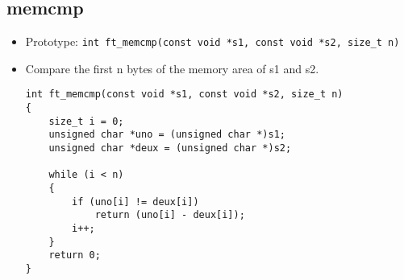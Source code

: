\documentclass{article}
\begin{document}
		\subsection{memcmp}
			\begin{itemize}[label=$\rightarrow$]
				\item Prototype: \texttt{int ft\_memcmp(const void *s1, const void *s2, size\_t n)       }                  
				\item Compare the first n bytes of the memory area of s1 and s2.
				\begin{verbatim}
int ft_memcmp(const void *s1, const void *s2, size_t n)                         
{                                                                               
    size_t i = 0;                                                               
    unsigned char *uno = (unsigned char *)s1;                                   
    unsigned char *deux = (unsigned char *)s2;                                  
                                                                                
    while (i < n)                                                               
    {                                                                           
        if (uno[i] != deux[i])                                                  
            return (uno[i] - deux[i]);                                          
        i++;                                                                    
    }                                                                           
    return 0;                                                                   
}   
				\end{verbatim}
			\end{itemize}
		
\end{document}
